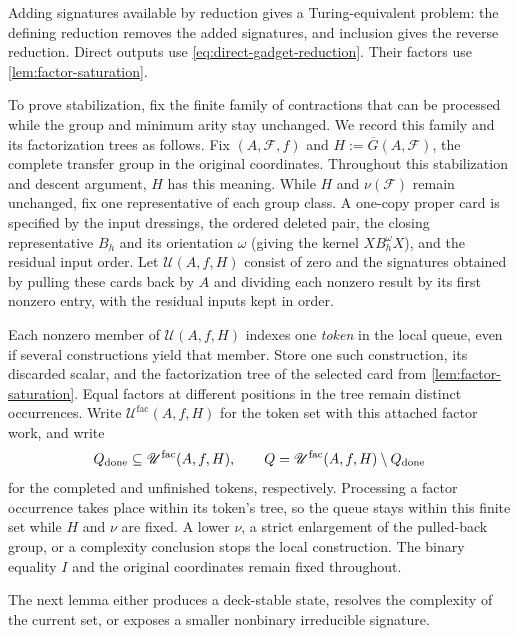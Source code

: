 \documentclass[11pt,letterpaper,onecolumn]{article}
\theoremstyle{plain}
\theoremstyle{definition}
\theoremstyle{remark}
\newcommand{\cF}{\mathcal F}
\begin{document}
Adding signatures available by reduction gives a Turing-equivalent problem:
the defining reduction removes the added signatures, and inclusion gives
the reverse reduction.  Direct outputs use
\cref{eq:direct-gadget-reduction}. Their factors use
\cref{lem:factor-saturation}.

To prove stabilization, fix the finite family of contractions that can
be processed while the group and minimum arity stay unchanged. We record
this family and its factorization trees as follows. Fix \((A,\cF,f)\) and
\(H:=\overline G(A,\cF)\), the complete transfer group in the original
coordinates. Throughout this stabilization and descent argument, \(H\)
has this meaning. While \(H\) and \(\nu(\cF)\) remain
unchanged, fix one representative of each group class. A one-copy proper
card is specified by the input dressings, the ordered deleted pair,
the closing representative \(B_h\) and its orientation \(\omega\)
(giving the kernel \(XB_h^\omega X\)), and the residual input order.
Let \(\mathscr U(A,f,H)\) consist of zero and the signatures obtained by
pulling these cards back by \(A\) and dividing each nonzero result by its
first nonzero entry, with the residual inputs kept in order.

Each nonzero member of \(\mathscr U(A,f,H)\) indexes one \emph{token} in
the local queue, even if several constructions yield that member. Store
one such construction, its discarded scalar, and the factorization tree of
the selected card from \cref{lem:factor-saturation}. Equal factors at
different positions in the tree remain distinct occurrences.
Write \(\mathscr U^{\mathrm{fac}}(A,f,H)\) for the token set with this
attached factor work, and write
\[
 Q_{\rm done}\subseteq\mathscr U^{\mathrm{fac}}(A,f,H),
 \qquad
 Q=\mathscr U^{\mathrm{fac}}(A,f,H)\setminus Q_{\rm done}
\]
for the completed and unfinished tokens, respectively. Processing a factor
occurrence takes place within its token's tree, so the queue stays within
this finite set while \(H\) and \(\nu\) are fixed. A lower \(\nu\), a
strict enlargement of the pulled-back group, or a complexity conclusion
stops the local construction. The binary equality \(I\) and the original
coordinates remain fixed throughout.

The next lemma either produces a deck-stable state, resolves the complexity
of the current set, or exposes a smaller nonbinary irreducible signature.
\end{document}
